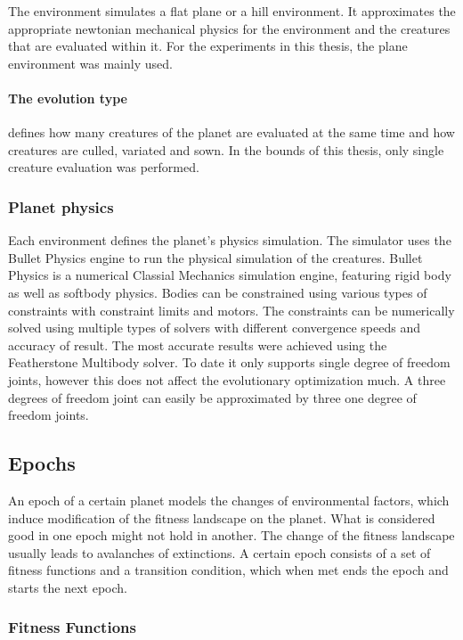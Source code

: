 \documentclass[main]{subfiles}
\begin{document}
The environment simulates a flat plane or a hill environment. It approximates the appropriate newtonian mechanical physics for the environment and the creatures that are evaluated within it. For the experiments in this thesis, the plane environment was mainly used.

\paragraph{The evolution type} defines how many creatures of the planet are evaluated at the same time and how creatures are culled, variated and sown. In the bounds of this thesis, only single creature evaluation was performed. 

\subsubsection{Planet physics}

Each environment defines the planet's physics simulation. The simulator uses the Bullet Physics engine\cite{bulletphysics} to run the physical simulation of the creatures. Bullet Physics is a numerical Classial Mechanics simulation engine, featuring rigid body as well as softbody physics. Bodies can be constrained using various types of constraints with constraint limits and motors. The constraints can be numerically solved using multiple types of solvers with different convergence speeds and accuracy of result. The most accurate results were achieved using the Featherstone Multibody solver. To date it only supports single degree of freedom joints, however this does not affect the evolutionary optimization much. A three degrees of freedom joint can easily be approximated by three one degree of freedom joints.

\subsection{Epochs}

An epoch of a certain planet models the changes of environmental factors, which induce modification of the fitness landscape on the planet. What is considered good in one epoch might not hold in another. The change of the fitness landscape usually leads to avalanches of extinctions. A certain epoch consists of a set of fitness functions and a transition condition, which when met ends the epoch and starts the next epoch.

\subsubsection{Fitness Functions}
\end{document}
